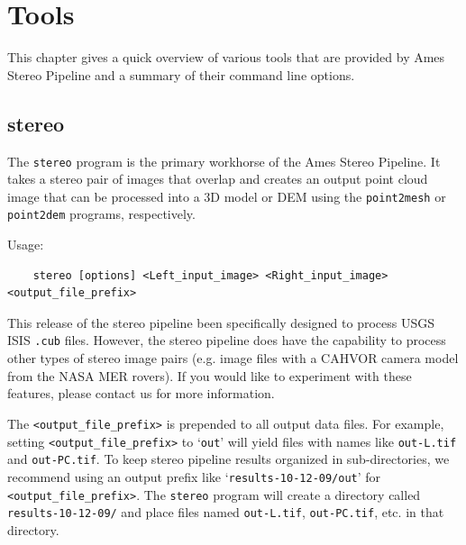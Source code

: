 \chapter{Tools}

This chapter gives a quick overview of various tools that are provided by
Ames Stereo Pipeline and a summary of their command line options.


\section{stereo}
\label{stereo}

The \texttt{stereo} program is the primary workhorse of the Ames
Stereo Pipeline.  It takes a stereo pair of images that overlap and
creates an output point cloud image that can be processed into a 3D
model or DEM using the \texttt{point2mesh} or \texttt{point2dem}
programs, respectively.  

\medskip

Usage:
\begin{verbatim}
    stereo [options] <Left_input_image> <Right_input_image> <output_file_prefix>
\end{verbatim}

\medskip

This release of the stereo pipeline been specifically designed to
process USGS ISIS \verb=.cub= files.  However, the stereo pipeline
does have the capability to process other types of stereo image pairs
(e.g. image files with a CAHVOR camera model from the NASA MER
rovers).  If you would like to experiment with these features, please
contact us for more information.

The \verb=<output_file_prefix>= is prepended to all output data files.
For example, setting \verb=<output_file_prefix>= to `\verb=out=' will
yield files with names like \verb=out-L.tif= and \verb=out-PC.tif=.
To keep stereo pipeline results organized in sub-directories, we
recommend using an output prefix like `\verb=results-10-12-09/out='
for \verb=<output_file_prefix>=.  The \verb=stereo= program will
create a directory called \verb=results-10-12-09/= and place files
named \verb=out-L.tif=, \verb=out-PC.tif=, etc. in that directory.


